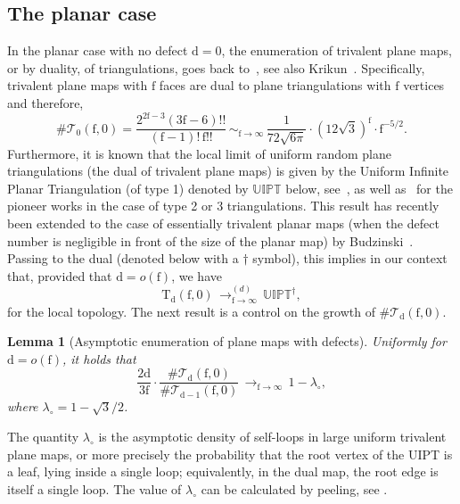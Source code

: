 \documentclass[JEP,XML,SOM,Unicode,NoFloatCountersInSection,NoEqCountersInSection]{cedram}
\theoremstyle{plain}
\newtheorem{lemma}[theorem]{Lemma}
\theoremstyle{definition}
\theoremstyle{remark}
\newcommand{\Triv}{\mathrm{T}}
\newcommand{\face}{\mathrm{f}}
\newcommand{\defect}{\mathrm{d}}
\newcommand{\cv}[1][n]{\,\mathop{\longrightarrow}^{}_{#1 \to \infty}\,}
\newcommand{\cvloi}[1][n]{\,\mathop{\longrightarrow}^{(d)}_{#1 \to \infty}\,}
\newcommand{\equi}[1][n]{\,\mathop{\sim}^{}_{#1 \to \infty}\,}
\begin{document}
\subsection{The planar case}
\label{ssec:defaut_planar}

In the planar case with no defect $\defect=0$, the enumeration of trivalent plane maps, or by duality, of triangulations, goes back to~\cite{MNS70}, see also Krikun~\cite{Kri07}.
Specifically, trivalent plane maps with $\face$ faces are dual to plane triangulations with $\face$ vertices and therefore,
\begin{equation}\label{eq:triangulations}
\#\mathcal{T}_0(\face,0)
= \frac{2^{2\face-3} (3\face-6)!!}{(\face-1)! \, \face!!}
\equi[\face] \frac{1}{72 \sqrt{6\pi}} \cdot (12\sqrt{3})^\face \cdot \face^{-5/2}.
\end{equation}
Furthermore, it is known that the local limit of uniform random plane triangulations (the dual of trivalent plane maps) is given by the Uniform Infinite Planar Triangulation (of type 1) denoted by $\mathbb{UIPT}$ below, see~\cite[Th.\,6.1]{Ste18}, as well as~\cite{AS03} for the pioneer works in the case of type 2 or 3 triangulations. This result has recently been extended to the case of essentially trivalent planar maps (\ie when the defect number is negligible in front of the size of the planar map) by Budzinski~\cite[Cor.\,2]{Bud21}. Passing to the dual (denoted below with a $\dagger$ symbol), this implies in our context that, provided that $ \defect = o(\face)$, we have
\begin{equation} \label{eq:convUIPT}
\Triv_{ \defect}(\face, 0) \cvloi[\face] \mathbb{UIPT}^\dagger,
\end{equation}
for the local topology.
The next result is a control on the growth of $\#\mathcal{T}_ \defect(\face,0)$.

\begin{lemma}[Asymptotic enumeration of plane maps with defects]
\label{lem:ratio_defauts}
Uniformly for $\defect = o(\face)$, it holds that
\[
\frac{2 \defect}{3 \face} \cdot \frac{\#\mathcal{T}_{\defect}(\face, 0)}{\#\mathcal{T}_{\defect-1}(\face,0)} \cv[\face] 1-\lambda_{\circ},
\]
where $\lambda_{\circ} = 1 - \sqrt{3}/2$.\end{lemma}

The quantity $\lambda_{\circ}$ is the asymptotic density of self-loops in large uniform trivalent plane maps, or more precisely the probability that the root vertex of the UIPT is a leaf, lying inside a single loop; equivalently, in the dual map, the root edge is itself a single loop. The value of $\lambda_{\circ}$ can be calculated by peeling, see \eg \cite[\S 2]{CLG19}.
\end{document}
